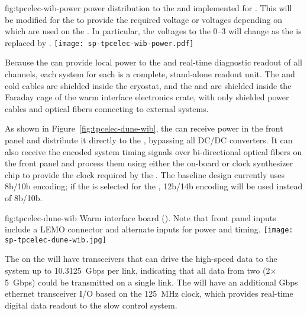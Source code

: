 \begin{dunefigure}
{fig:tpcelec-wib-power}
{ power distribution to the  and  implemented for . This will be modified for the  to provide the required voltage or voltages depending on which  are used on the . In particular, the voltages to the  \numrange{0}{3} will change as the   is replaced by . }
\texttt{[image: sp-tpcelec-wib-power.pdf]}
\end{dunefigure}

Because the  can provide local power to the  and real-time diagnostic readout of all channels,
each  system for each  is a complete, stand-alone readout unit. The  and cold cables are shielded
inside the cryostat, and the  and  are shielded inside the Faraday cage of the warm interface
electronics crate, with only shielded power cables and optical fibers connecting to external systems.

As shown in Figure~\ref{fig:tpcelec-dune-wib}, the  can receive  power in the front panel and distribute it directly to the , bypassing all DC/DC converters.
It can also receive the encoded system timing signals over bi-directional optical
fibers on the front panel and process them using either
the on-board  or clock synthesizer chip to provide the clock required by the .
The baseline  design currently uses 8b/10b encoding; if the    is selected for
the  , 12b/14b encoding will be used instead of 8b/10b.

\begin{dunefigure}
{fig:tpcelec-dune-wib}
{Warm interface board (). Note that front panel inputs include a LEMO connector and alternate inputs for  power and timing.}
\texttt{[image: sp-tpcelec-dune-wib.jpg]}
\end{dunefigure}

The  on the  will have
transceivers that can drive the high-speed data to the  system up to
10.3125~Gbps per link, indicating that all data from
two  (2$\times$5~Gbps) could be transmitted on a single link.
The  will have an additional Gbps ethernet transceiver I/O based on the \SI{125}{MHz} clock, which 
provides real-time digital data readout to the slow control system.

